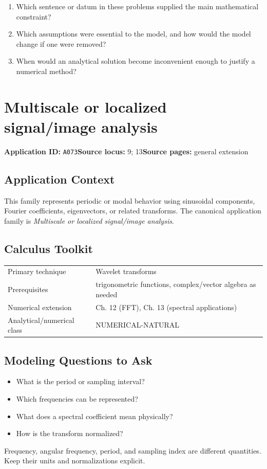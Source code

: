 \documentclass[11pt]{book}
\newcommand{\pid}[1]{\texttt{#1}}
\begin{document}
\begin{reflectionbox}\begin{enumerate}
\item Which sentence or datum in these problems supplied the main mathematical constraint?
\item Which assumptions were essential to the model, and how would the model change if one were removed?
\item When would an analytical solution become inconvenient enough to justify a numerical method?
\end{enumerate}\end{reflectionbox}
\chapter{Multiscale or localized signal/image analysis}\label{app:A073}
\textbf{Application ID:} \pid{A073}\quad \textbf{Source locus:} 9; 13\quad \textbf{Source pages:} general extension
\section*{Application Context}
This family represents periodic or modal behavior using sinusoidal components, Fourier coefficients, eigenvectors, or related transforms. The canonical application family is \emph{Multiscale or localized signal/image analysis}.
\section*{Calculus Toolkit}
\begin{tabularx}{\textwidth}{@{}lX@{}}\toprule
Primary technique & Wavelet transforms \\
Prerequisites & trigonometric functions, complex/vector algebra as needed \\
Numerical extension & Ch. 12 (FFT), Ch. 13 (spectral applications) \\
Analytical/numerical class & NUMERICAL-NATURAL \\
\bottomrule\end{tabularx}
\section*{Modeling Questions to Ask}\begin{itemize}
\item What is the period or sampling interval?
\item Which frequencies can be represented?
\item What does a spectral coefficient mean physically?
\item How is the transform normalized?
\end{itemize}
\begin{errorbox}Frequency, angular frequency, period, and sampling index are different quantities. Keep their units and normalizations explicit.\end{errorbox}
\end{document}

